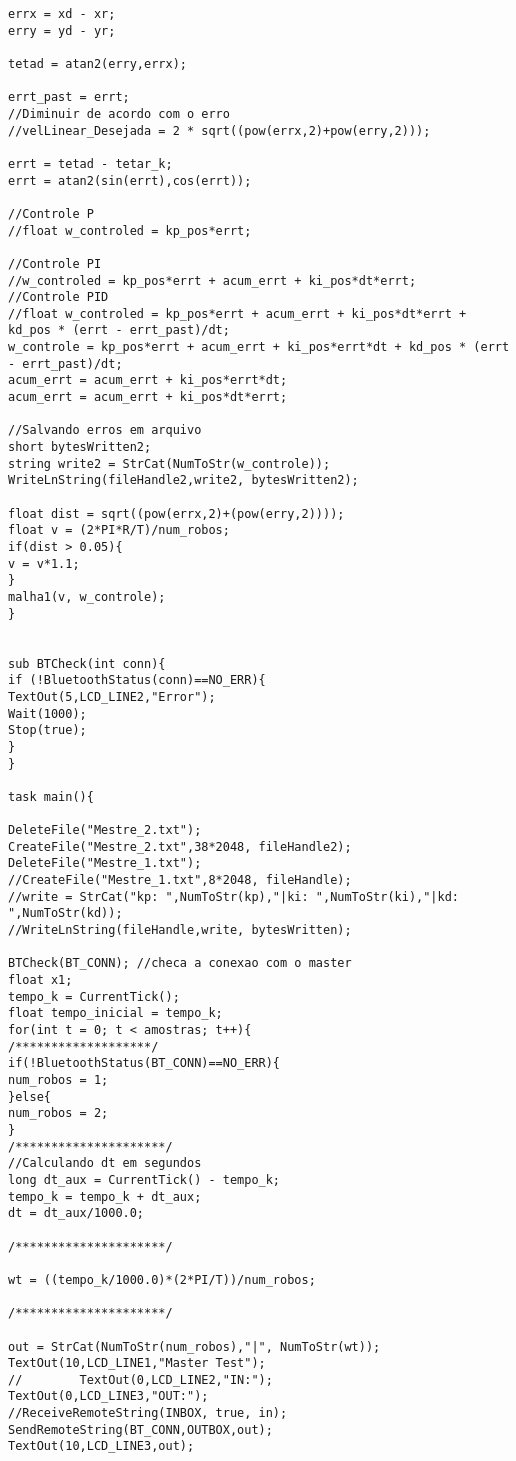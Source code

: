\begin{apendicesenv}
\begin{lstlisting}
errx = xd - xr;
erry = yd - yr;

tetad = atan2(erry,errx);

errt_past = errt;
//Diminuir de acordo com o erro
//velLinear_Desejada = 2 * sqrt((pow(errx,2)+pow(erry,2)));

errt = tetad - tetar_k;
errt = atan2(sin(errt),cos(errt));

//Controle P
//float w_controled = kp_pos*errt;

//Controle PI
//w_controled = kp_pos*errt + acum_errt + ki_pos*dt*errt;
//Controle PID
//float w_controled = kp_pos*errt + acum_errt + ki_pos*dt*errt + kd_pos * (errt - errt_past)/dt;
w_controle = kp_pos*errt + acum_errt + ki_pos*errt*dt + kd_pos * (errt - errt_past)/dt;
acum_errt = acum_errt + ki_pos*errt*dt;
acum_errt = acum_errt + ki_pos*dt*errt;

//Salvando erros em arquivo
short bytesWritten2;
string write2 = StrCat(NumToStr(w_controle));
WriteLnString(fileHandle2,write2, bytesWritten2);

float dist = sqrt((pow(errx,2)+(pow(erry,2))));
float v = (2*PI*R/T)/num_robos;
if(dist > 0.05){
v = v*1.1;
}
malha1(v, w_controle);
}


sub BTCheck(int conn){
if (!BluetoothStatus(conn)==NO_ERR){
TextOut(5,LCD_LINE2,"Error");
Wait(1000);
Stop(true);
}
}

task main(){

DeleteFile("Mestre_2.txt");
CreateFile("Mestre_2.txt",38*2048, fileHandle2);
DeleteFile("Mestre_1.txt");
//CreateFile("Mestre_1.txt",8*2048, fileHandle);
//write = StrCat("kp: ",NumToStr(kp),"|ki: ",NumToStr(ki),"|kd: ",NumToStr(kd));
//WriteLnString(fileHandle,write, bytesWritten);

BTCheck(BT_CONN); //checa a conexao com o master
float x1;
tempo_k = CurrentTick();
float tempo_inicial = tempo_k;
for(int t = 0; t < amostras; t++){
/*******************/
if(!BluetoothStatus(BT_CONN)==NO_ERR){
num_robos = 1;
}else{
num_robos = 2;
}
/*********************/
//Calculando dt em segundos
long dt_aux = CurrentTick() - tempo_k;
tempo_k = tempo_k + dt_aux;
dt = dt_aux/1000.0;

/*********************/

wt = ((tempo_k/1000.0)*(2*PI/T))/num_robos;

/*********************/

out = StrCat(NumToStr(num_robos),"|", NumToStr(wt));
TextOut(10,LCD_LINE1,"Master Test");
//        TextOut(0,LCD_LINE2,"IN:");
TextOut(0,LCD_LINE3,"OUT:");
//ReceiveRemoteString(INBOX, true, in);
SendRemoteString(BT_CONN,OUTBOX,out);
TextOut(10,LCD_LINE3,out);


\end{lstlisting}
\end{apendicesenv}
